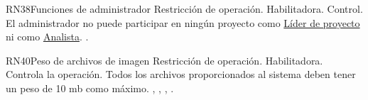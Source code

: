 \begin{BussinesRule}{RN38}{Funciones de administrador} 
	\BRitem[Tipo:] Restricción de operación. 
	\BRitem[Clase:] Habilitadora. 
	\BRitem[Nivel:] Control. %
	\BRitem[Descripción:] El administrador no puede participar en ningún proyecto como \hyperlink{jefe}{Líder de proyecto} ni como \hyperlink{analista}{Analista}.
	 .
\end{BussinesRule}

\begin{BussinesRule}{RN40}{Peso de archivos de imagen}
	\BRitem[Tipo:] Restricción de operación. 
	\BRitem[Clase:] Habilitadora. 
	\BRitem[Nivel:] Controla la operación. %
	\BRitem[Descripción:] Todos los archivos proporcionados al sistema deben tener un peso de 10 mb como máximo.
	 , , , .
\end{BussinesRule}